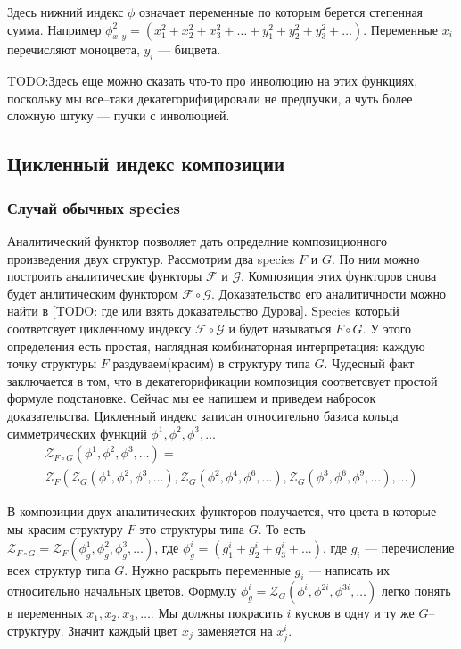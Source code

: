 Здесь нижний индекс $\phi$ означает переменные по которым берется степенная
сумма. Например $\phi_{x, y}^2 = 
(x_1^2 + x_2^2 + x_3^2 + \dots + y_1^2 + y_2^2 + y_3^2 + \dots)$.
Переменные $x_i$ перечисляют моноцвета, $y_i$ --- бицвета.

TODO:Здесь еще можно сказать что-то про инволюцию на этих функциях, поскольку мы
все--таки декатегорифицировали не предпучки, а чуть более сложную штуку ---
пучки с инволюцией.

\subsection{Цикленный индекс композиции}
\subsubsection{Случай обычных species}
Аналитический функтор позволяет дать определние композиционного произведения
двух структур. Рассмотрим два species $F$ и $G$. По ним можно построить
аналитические функторы $\mathcal F$ и $\mathcal G$. Композиция этих функторов
снова будет анлитическим функтором $\mathcal F \circ \mathcal G$. Доказательство
его аналитичности можно найти в [TODO: где или взять доказательство Дурова].
Species который соответсвует цикленному индексу $\mathcal F \circ \mathcal G$ и
будет называться $F \circ G$. У этого определения есть простая, наглядная
комбинаторная интерпретация: каждую точку структуры $F$ раздуваем(красим) в
структуру типа $G$. Чудесный факт заключается в том, что в декатегорификации
композиция соответсвует простой формуле подстановке. Сейчас мы ее напишем и
приведем набросок доказательства. Цикленный индекс записан относительно базиса
кольца симметрических функций $\phi^1, \phi^2, \phi^3, \dots$
\begin{multline}
\label{eq:zfg}
	\mathcal Z_{F \circ G} (\phi^1, \phi^2, \phi^3, \dots) = \\
	\mathcal Z_F(
		\mathcal Z_G(\phi^1, \phi^2, \phi^3, \dots),
		\mathcal Z_G(\phi^2, \phi^4, \phi^6, \dots),
		\mathcal Z_G(\phi^3, \phi^6, \phi^9, \dots),
		\dots
	)
\end{multline}

В композиции двух аналитических функторов получается, что цвета в которые мы
красим структуру $F$ это структуры типа $G$. То есть $\mathcal Z_{F \circ G} =
\mathcal Z_F(\phi_g^1, \phi_g^2, \phi_g^3, \dots)$, где $\phi_g^i = (g_1^i +
g_2^i + g_3^i + \dots)$, где $g_i$ --- перечисление всех структур типа $G$.
Нужно раскрыть переменные $g_i $ --- написать их относительно начальных цветов.
Формулу $\phi_g^i = \mathcal Z_G(\phi^i, \phi^{2i}, \phi^{3i}, \dots)$ легко
понять в переменных $x_1, x_2, x_3, \dots$. Мы должны покрасить $i$ кусков в
одну и ту же $G$--структуру. Значит каждый цвет $x_j$ заменяется на $x_j^i$.

